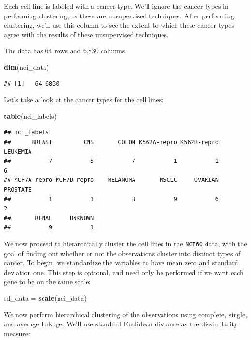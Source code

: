 \documentclass[openany]{book}
\newenvironment{Shaded}{\begin{snugshade}}{\end{snugshade}}
\newcommand{\KeywordTok}[1]{\textcolor[rgb]{0.13,0.29,0.53}{\textbf{#1}}}
\newcommand{\NormalTok}[1]{#1}
\newcommand{\StringTok}[1]{\textcolor[rgb]{0.31,0.60,0.02}{#1}}
\begin{document}
Each cell line is labeled with a cancer type. We'll ignore the
cancer types in performing clustering, as these are unsupervised
techniques. After performing clustering, we'll use this column to see the extent to which these cancer types agree with the results of these
unsupervised techniques.

The data has 64 rows and 6,830 columns.

\begin{Shaded}
\begin{Highlighting}[]
\KeywordTok{dim}\NormalTok{(nci_data)}
\end{Highlighting}
\end{Shaded}

\begin{verbatim}
## [1]   64 6830
\end{verbatim}

Let's take a look at the cancer types for the cell lines:

\begin{Shaded}
\begin{Highlighting}[]
\KeywordTok{table}\NormalTok{(nci_labels)}
\end{Highlighting}
\end{Shaded}

\begin{verbatim}
## nci_labels
##      BREAST         CNS       COLON K562A-repro K562B-repro    LEUKEMIA 
##           7           5           7           1           1           6 
## MCF7A-repro MCF7D-repro    MELANOMA       NSCLC     OVARIAN    PROSTATE 
##           1           1           8           9           6           2 
##       RENAL     UNKNOWN 
##           9           1
\end{verbatim}

We now proceed to hierarchically cluster the cell lines in the \texttt{NCI60} data,
with the goal of finding out whether or not the observations cluster into
distinct types of cancer. To begin, we standardize the variables to have
mean zero and standard deviation one. This step is
optional, and need only be performed if we want each gene to be on the
same scale:

\begin{Shaded}
\begin{Highlighting}[]
\NormalTok{sd_data =}\StringTok{ }\KeywordTok{scale}\NormalTok{(nci_data)}
\end{Highlighting}
\end{Shaded}

We now perform hierarchical clustering of the observations using complete,
single, and average linkage. We'll use standard Euclidean distance as the dissimilarity
measure:
\end{document}
